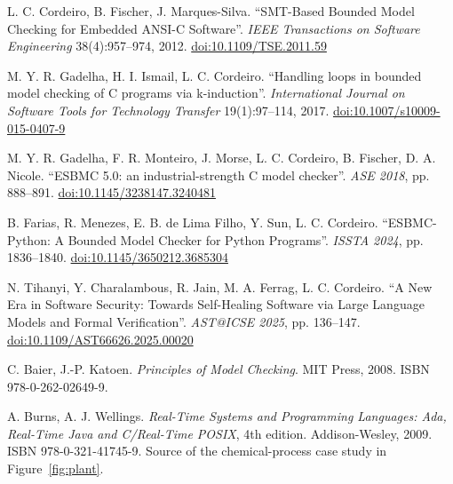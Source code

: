 \documentclass[11pt,a4paper]{article}
\begin{document}
\sloppy
\begin{enumerate}[leftmargin=2.4em,itemsep=3pt,label={[\arabic*]}]
  \item L. C. Cordeiro, B. Fischer, J. Marques-Silva. ``SMT-Based Bounded Model
        Checking for Embedded ANSI-C Software''. \emph{IEEE Transactions on
        Software Engineering} 38(4):957--974, 2012.
        \href{https://doi.org/10.1109/TSE.2011.59}{doi:10.1109/TSE.2011.59}
  \item M. Y. R. Gadelha, H. I. Ismail, L. C. Cordeiro. ``Handling loops in
        bounded model checking of C programs via k-induction''.
        \emph{International Journal on Software Tools for Technology Transfer}
        19(1):97--114, 2017.
        \href{https://doi.org/10.1007/s10009-015-0407-9}{doi:10.1007/s10009-015-0407-9}
  \item M. Y. R. Gadelha, F. R. Monteiro, J. Morse, L. C. Cordeiro, B. Fischer,
        D. A. Nicole. ``ESBMC 5.0: an industrial-strength C model checker''.
        \emph{ASE 2018}, pp. 888--891.
        \href{https://doi.org/10.1145/3238147.3240481}{doi:10.1145/3238147.3240481}
  \item B. Farias, R. Menezes, E. B. de Lima Filho, Y. Sun, L. C. Cordeiro.
        ``ESBMC-Python: A Bounded Model Checker for Python Programs''.
        \emph{ISSTA 2024}, pp. 1836--1840.
        \href{https://doi.org/10.1145/3650212.3685304}{doi:10.1145/3650212.3685304}
  \item N. Tihanyi, Y. Charalambous, R. Jain, M. A. Ferrag, L. C. Cordeiro.
        ``A New Era in Software Security: Towards Self-Healing Software via
        Large Language Models and Formal Verification''. \emph{AST@ICSE 2025},
        pp. 136--147.
        \href{https://doi.org/10.1109/AST66626.2025.00020}{doi:10.1109/AST66626.2025.00020}
  \item C. Baier, J.-P. Katoen. \emph{Principles of Model Checking}. MIT Press,
        2008. ISBN 978-0-262-02649-9.
  \item A. Burns, A. J. Wellings. \emph{Real-Time Systems and Programming
        Languages: Ada, Real-Time Java and C/Real-Time POSIX}, 4th edition.
        Addison-Wesley, 2009. ISBN 978-0-321-41745-9. Source of the
        chemical-process case study in Figure~\ref{fig:plant}.
\end{enumerate}
\end{document}
